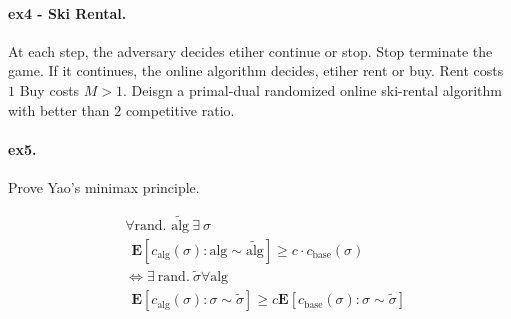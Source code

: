 \documentclass{article}
\newcommand{\expp}[1]{ \mathbf{E} \left[ {#1} \right]}
\begin{document}
\begin{multicols*}{2}
  \paragraph{ex4 - Ski Rental.} At each step, the adversary decides etiher continue or stop. Stop terminate the game. If it continues, the online algorithm decides, etiher rent or buy. Rent costs $1$ Buy costs $M > 1$. Deisgn a primal-dual randomized online ski-rental algorithm with better than $2$ competitive ratio.  
  \paragraph{ex5.} Prove Yao's minimax principle. 
  
  \newcommand{\dalg}[1]{\expp{#1 : \text{alg} \sim \tilde{\text{alg}}}}
  \newcommand{\dsig}[1]{\expp{#1 : \sigma \sim \tilde{\sigma}}}
  \newcommand{\calg}{c_{\text{alg}}}
  \newcommand{\cbase}{c_{\text{base}}}
  \begin{equation*}
    \begin{split}
      & \forall \text{rand. } \tilde{\text{alg}} \  \exists  \ \sigma  \\
      & \ \ \dalg{ \calg\left( \sigma \right) } \ge c \cdot   \cbase\left( \sigma \right) \\  
      & \Leftrightarrow \exists \ \text{rand.} \ \tilde{\sigma} \forall \text{alg} \\  
      & \ \ \dsig{  \calg\left( \sigma \right)  } \ge c \dsig{ \cbase \left( \sigma \right)  } 
      \end{split}
  \end{equation*}

\end{multicols*}
\end{document}
